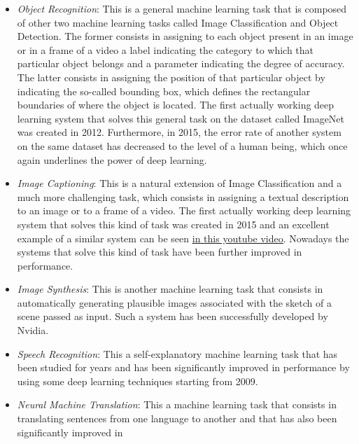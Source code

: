 \begin{itemize}
    \item \emph{Object Recognition}: This is a general machine
          learning task that is composed of other two machine learning
          tasks called Image Classification and Object Detection. The
          former consists in assigning to each object present in an
          image or in a frame of a video a label indicating the category
          to which that particular object belongs and a parameter
          indicating the degree of accuracy. The latter consists in
          assigning the position of that particular object by indicating
          the so-called bounding box, which defines the rectangular
          boundaries of where the object is located. The first actually
          working deep learning system that solves this general task on
          the dataset called ImageNet was created in 2012.
          Furthermore, in 2015, the error rate of another system on the
          same dataset has decreased to the level of a human being,
          which once again underlines the power of deep learning.
    \item \emph{Image Captioning}: This is a natural extension of
          Image Classification and a much more challenging task, which
          consists in assigning a textual description to an image or to
          a frame of a video. The first actually working deep learning
          system that solves this kind of task was created in 2015 and
          an excellent example of a similar system can be seen
          \href{https://www.youtube.com/watch?v=8BFzu9m52sc}{\underline{in this youtube video}}.
          Nowadays the systems that solve this kind of task have been
          further improved in performance.
    \item \emph{Image Synthesis}: This is another machine learning task
          that consists in automatically generating plausible images
          associated with the sketch of a scene passed as input. Such a
          system has been successfully developed by Nvidia.
    \item \emph{Speech Recognition}: This a self-explanatory machine
          learning task that has been studied for years and has been
          significantly improved in performance by using some deep
          learning techniques starting from 2009.
    \item \emph{Neural Machine Translation}: This a machine learning
          task that consists in translating sentences from one language
          to another and that has also been significantly improved in

\end{itemize}
